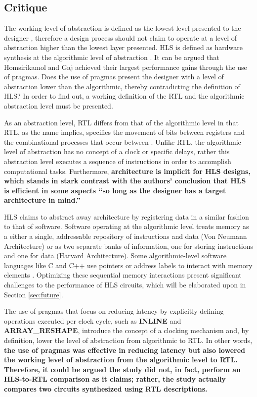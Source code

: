\documentclass[12pt,journal,compsoc,onecolumn]{IEEEtran}
\begin{document}
\subsection{Critique}
The working level of abstraction is defined as the lowest level presented to the designer \cite{Harris+Harris}, therefore a design process should not claim to operate at a level of abstraction higher than the lowest layer presented. HLS is defined as hardware synthesis at the algorithmic level of abstraction \cite{3}\cite{4}. It can be argued that Homsirikamol and Gaj achieved their largest performance gains through the use of pragmas. Does the use of pragmas present the designer with a level of abstraction lower than the algorithmic, thereby contradicting the definition of HLS? In order to find out, a working definition of the RTL and the algorithmic abstraction level must be presented.

As an abstraction level, RTL differs from that of the algorithmic level in that RTL, as the name implies, specifies the movement of bits between registers and the combinational processes that occur between \cite{churtl}. Unlike RTL, the algorithmic level of abstraction has no concept of a clock or specific delays, rather this abstraction level executes a sequence of instructions in order to accomplish computational tasks\cite{churtl}. Furthermore, \textbf{architecture is implicit for HLS designs\cite{bsv}, which stands in stark contrast with the authors' conclusion that HLS is efficient in some aspects ``so long as the designer has a target architecture in mind.'' }

HLS claims to abstract away architecture by registering data in a similar fashion to that of software\cite{legup}. Software operating at the algorithmic level treats memory as a either a single, addressable repository of instructions and data (Von Neumann Architecture) or as two separate banks of information, one for storing instructions and one for data (Harvard Architecture). Some algorithmic-level software languages like C and C++ use pointers or address labels to interact with memory elements \cite{cpointers}. Optimizing these sequential memory interactions present significant challenges to the performance of HLS circuits, which will be elaborated upon in Section \ref{sec:future}.

The use of pragmas that focus on reducing latency by explicitly defining operations executed per clock cycle, such as \textbf{INLINE} and \textbf{ARRAY\_RESHAPE}, introduce the concept of a clocking mechanism and, by definition, lower the level of abstraction from algorithmic to RTL. In other words, \textbf{the use of pragmas was effective in reducing latency but also lowered the working level of abstraction from the algorithmic level to RTL. Therefore, it could be argued the study did not, in fact, perform an HLS-to-RTL comparison as it claims; rather, the study actually compares two circuits synthesized using RTL descriptions.}
\end{document}
